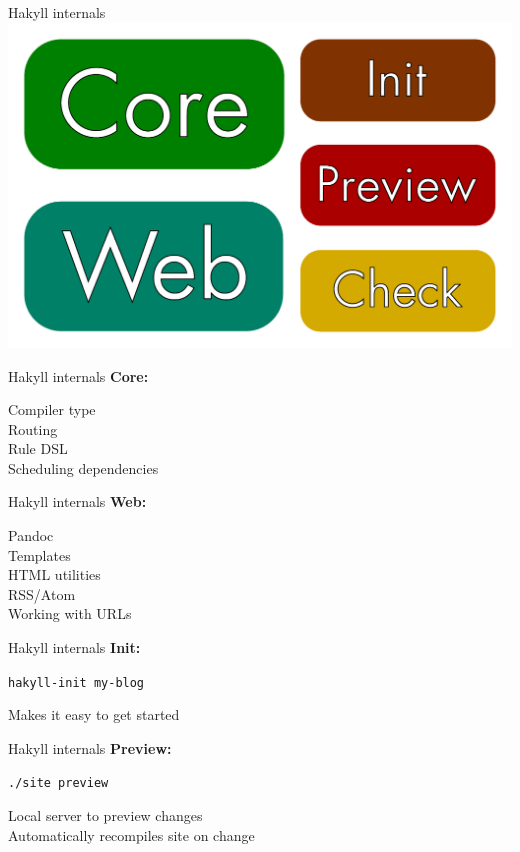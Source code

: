 \documentclass[20pt]{beamer}
\newcommand{\vspaced}{
    \vspace{5mm}
}
\begin{document}

\begin{frame}{Hakyll internals}
    \includegraphics[width=\textwidth]{../2013-odhac-hakyll/images/components.pdf}
\end{frame}

\begin{frame}{Hakyll internals}
    \textbf{Core:} \\
    \vspaced
    Compiler type \\
    Routing \\
    Rule DSL \\
    Scheduling dependencies \\
\end{frame}

\begin{frame}{Hakyll internals}
    \textbf{Web:} \\
    \vspaced
    Pandoc \\
    Templates \\
    HTML utilities \\
    RSS/Atom \\
    Working with URLs \\
\end{frame}

\begin{frame}{Hakyll internals}
    \textbf{Init:} \\
    \vspaced
    \texttt{hakyll-init my-blog} \\
    \vspaced
    Makes it easy to get started \\
\end{frame}

\begin{frame}{Hakyll internals}
    \textbf{Preview:} \\
    \vspaced
    \texttt{./site preview} \\
    \vspaced
    Local server to preview changes \\
    Automatically recompiles site on change \\
\end{frame}
\end{document}
